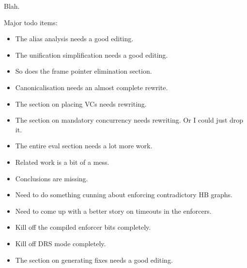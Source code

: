 Blah.


Major todo items:

\begin{itemize}
\item The alias analysis needs a good editing.
\item The unification simplification needs a good editing.
\item So does the frame pointer elimination section.
\item Canonicalisation needs an almost complete rewrite.
\item The section on placing VCs needs rewriting.
\item The section on mandatory concurrency needs rewriting.  Or I could
   just drop it.
\item The entire eval section needs a lot more work.
\item Related work is a bit of a mess.
\item Conclusions are missing.
\item Need to do something cunning about enforcing contradictory HB graphs.
\item Need to come up with a better story on timeouts in the enforcers.
\item Kill off the compiled enforcer bits completely.
\item Kill off DRS mode completely.
\item The section on generating fixes needs a good editing.
\end{itemize}
